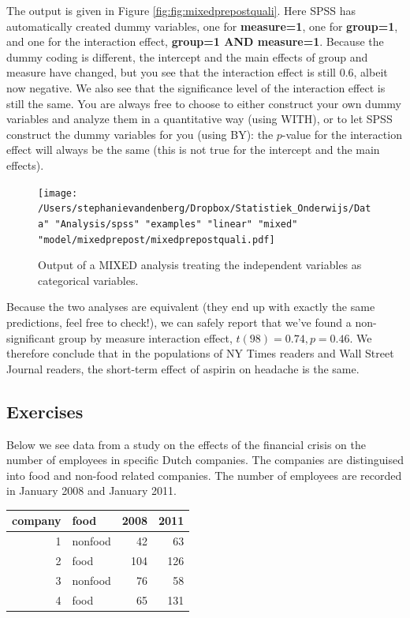 \documentclass[]{book}\usepackage[]{graphicx}\usepackage[]{color}
\newenvironment{knitrout}{}{} %
\begin{document}
The output is given in Figure \ref{fig:fig:mixedprepostquali}. Here SPSS has automatically created dummy variables, one for \textbf{measure=1}, one for \textbf{group=1}, and one for the interaction effect, \textbf{group=1 AND measure=1}. Because the dummy coding is different, the intercept and the main effects of group and measure have changed, but you see that the interaction effect is still 0.6, albeit now negative. We also see that the significance level of the interaction effect is still the same. You are always free to choose to either construct your own dummy variables and analyze them in a quantitative way (using WITH), or to let SPSS construct the dummy variables for you (using BY): the $p$-value for the interaction effect will always be the same (this is not true for the intercept and the main effects).



\begin{figure}[h]
    \begin{center}
       \texttt{[image: /Users/stephanievandenberg/Dropbox/Statistiek\_Onderwijs/Data" "Analysis/spss" "examples" "linear" "mixed" "model/mixedprepost/mixedprepostquali.pdf]}
    \end{center}
    \label{fig:mixedprepostquali}
    \caption{Output of a MIXED analysis treating the independent variables as categorical variables.}
\end{figure}



Because the two analyses are equivalent (they end up with exactly the same predictions, feel free to check!), we can safely report that we've found a non-significant group by measure interaction effect, $t(98)=0.74, p=0.46$. We therefore conclude that in the populations of NY Times readers and Wall Street Journal readers, the short-term effect of aspirin on headache is the same. 



\subsection{Exercises}

Below we see data from a study on the effects of the financial crisis on the number of employees in specific Dutch companies. The companies are distinguised into food and non-food related companies. The number of employees are recorded in January 2008 and January 2011.

\begin{knitrout}
\color{fgcolor}
\begin{tabular}{r|l|r|r}
\hline
company & food & 2008 & 2011\\
\hline
1 & nonfood & 42 & 63\\
\hline
2 & food & 104 & 126\\
\hline
3 & nonfood & 76 & 58\\
\hline
4 & food & 65 & 131\\
\hline
\end{tabular}


\end{knitrout}
\end{document}
